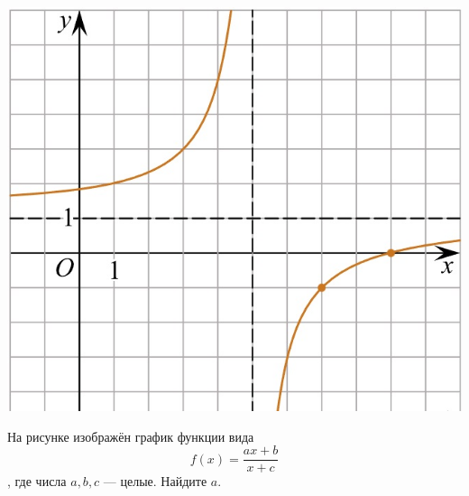 \begin{homework}[number=1]
\begin{listofex}
\begin{minipage}[t]{0.22\textwidth}
			\includegraphics[align=t, width=\textwidth]{pics/G101M4H2-9.jpg}
		\end{minipage}
		\item
		\begin{minipage}[t]{0.66\textwidth}
			На рисунке изображён график функции вида \[ f(x)=\dfrac{ax+b}{x+c} \], где числа \(a, b, c\) --- целые. Найдите \(a\).
		\end{minipage}
		\hspace{0.05\textwidth}
		\begin{minipage}[t]{0.22\textwidth}

\end{minipage}
\end{listofex}
\end{homework}
